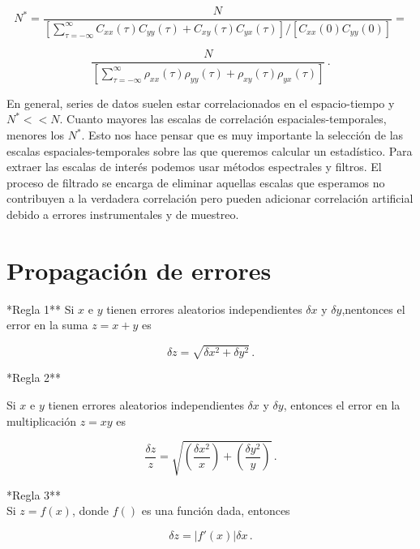 \documentclass[
]{agujournal2019}
\begin{document}
\[N^{*}=\frac{N}{\left[ \sum\limits^{\infty}_{\tau=-\infty}
C_{xx}(\tau)C_{yy}(\tau) + C_{xy}(\tau)C_{yx}(\tau)
\right]/\left[ C_{xx}(0)C_{yy}(0)\right]}=\]

\[\frac{N}{\left[\sum\limits^{\infty}_{\tau=-\infty}
               \rho_{xx}(\tau)\rho_{yy}(\tau) +
           \rho_{xy}(\tau)\rho_{yx}(\tau)\right]}\,.\]

\noindent En general, series de datos suelen estar correlacionados en el
espacio-tiempo y \(N^{*}<<N\). Cuanto mayores las escalas de correlación
espaciales-temporales, menores los \(N^*\). Esto nos hace pensar que es
muy importante la selección de las escalas espaciales-temporales sobre
las que queremos calcular un estadístico. Para extraer las escalas de
interés podemos usar métodos espectrales y filtros. El proceso de
filtrado se encarga de eliminar aquellas escalas que esperamos no
contribuyen a la verdadera correlación pero pueden adicionar correlación
artificial debido a errores instrumentales y de muestreo.

\hypertarget{propagaciuxf3n-de-errores}{%
\section{Propagación de errores}\label{propagaciuxf3n-de-errores}}

\vspace{0.5cm}

\noindent **Regla 1** \noindent Si \(x\) e \(y\) tienen errores
aleatorios independientes \(\delta{x}\) y \(\delta{y}\),nentonces el
error en la suma \(z=x+y\) es

\[\delta{z}=\sqrt{\delta{x}^2 + \delta{y}^2}\,.\]

\vspace{0.5cm}

\noindent **Regla 2**

\noindent Si \(x\) e \(y\) tienen errores aleatorios independientes
\(\delta{x}\) y \(\delta{y}\), entonces el error en la multiplicación
\(z=xy\) es

\[\frac{\delta{z}}{z}=\sqrt{\left(\frac{\delta{x}^2}{x}\right) + \left(\frac{\delta{y}^2}{y}\right)}\,.\]

\vspace{0.5cm}

\noindent **Regla 3**\\

\noindent Si \(z=f(x)\), donde \(f()\) es una función dada, entonces

\[\delta{z}=|f'(x)|\delta{x}\,.\]
\end{document}
